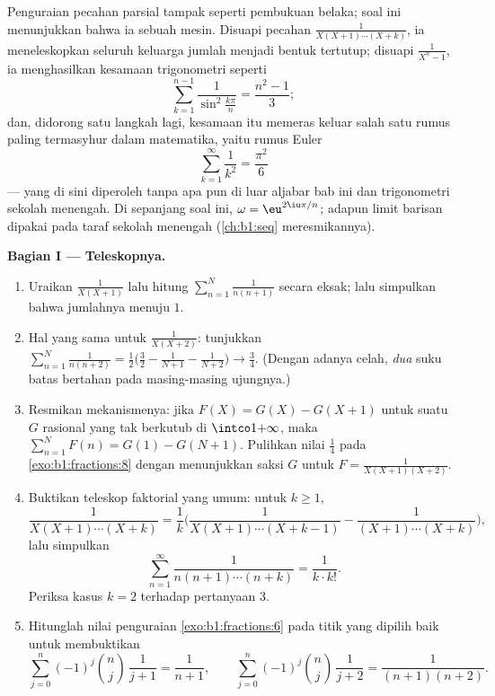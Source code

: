 \begin{problem}\label{pb:b1:fractions:1}
Penguraian pecahan parsial tampak seperti pembukuan belaka; soal ini
menunjukkan bahwa ia sebuah mesin. Disuapi pecahan
$\frac1{X(X+1)\cdots(X+k)}$, ia meneleskopkan seluruh keluarga jumlah
menjadi bentuk tertutup; disuapi $\frac1{X^n - 1}$, ia menghasilkan
kesamaan trigonometri seperti
\[
\sum_{k=1}^{n-1}\frac{1}{\sin^2\frac{k\pi}{n}} = \frac{n^2-1}{3} ;
\]
dan, didorong satu langkah lagi, kesamaan itu memeras keluar salah satu
rumus paling termasyhur dalam matematika, yaitu rumus Euler
\[
\sum_{k=1}^{\infty}\frac1{k^2} = \frac{\pi^2}{6}
\]
--- yang di sini diperoleh tanpa apa pun di luar aljabar bab ini dan
trigonometri sekolah menengah.
Di sepanjang soal ini, $\omega = \eu^{2\iu\pi/n}$; adapun limit barisan
dipakai pada taraf sekolah menengah (\cref{ch:b1:seq} meresmikannya).

\medskip
\noindent\textbf{Bagian I --- Teleskopnya.}
\begin{enumerate}
  \item Uraikan $\frac1{X(X+1)}$ lalu hitung $\sum_{n=1}^{N}
        \frac1{n(n+1)}$ secara eksak; lalu simpulkan bahwa jumlahnya menuju
        $1$.
  \item Hal yang sama untuk $\frac1{X(X+2)}$: tunjukkan $\sum_{n=1}^{N}
        \frac1{n(n+2)} = \frac12\bigl(\frac32 - \frac1{N+1} -
        \frac1{N+2}\bigr) \to \frac34$. (Dengan adanya celah, \emph{dua}
        suku batas bertahan pada masing-masing ujungnya.)
  \item Resmikan mekanismenya: jika $F(X) = G(X) - G(X+1)$ untuk
        suatu $G$ rasional yang tak berkutub di $\intco1{+\infty}$,
        maka $\sum_{n=1}^N F(n) = G(1) - G(N+1)$. Pulihkan
        nilai $\frac14$ pada \cref{exo:b1:fractions:8} dengan menunjukkan
        saksi $G$ untuk $F = \frac1{X(X+1)(X+2)}$.
  \item Buktikan teleskop faktorial yang umum: untuk $k \geq 1$,
        \[
        \frac{1}{X(X+1)\cdots(X+k)}
        = \frac1k\biggl(\frac{1}{X(X+1)\cdots(X+k-1)}
        - \frac{1}{(X+1)\cdots(X+k)}\biggr),
        \]
        lalu simpulkan
        \[
        \sum_{n=1}^{\infty}\frac{1}{n(n+1)\cdots(n+k)}
        = \frac{1}{k \cdot k!} .
        \]
        Periksa kasus $k = 2$ terhadap pertanyaan 3.
  \item Hitunglah nilai penguraian \cref{exo:b1:fractions:6}
        pada titik yang dipilih baik untuk membuktikan
        \[
        \sum_{j=0}^{n}(-1)^j\binom nj\,\frac1{j+1}
        = \frac1{n+1},
        \qquad
        \sum_{j=0}^{n}(-1)^j\binom nj\,\frac1{j+2}
        = \frac1{(n+1)(n+2)} .
        \]
\end{enumerate}


\end{problem}
